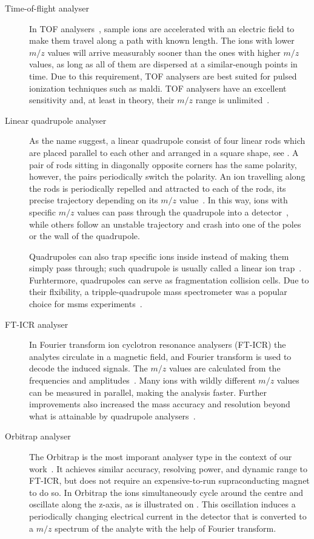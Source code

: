 \begin{description}
  \item[Time-of-flight analyser] In TOF analysers~\cite{stephens1946pulsed}, sample ions are accelerated with an electric field to make them travel along a path with known length. The ions with lower \(m/z\) values will arrive measurably sooner than the ones with higher \(m/z\) values, as long as all of them are dispersed at a similar-enough points in time. Due to this requirement, TOF analysers are best suited for pulsed ionization techniques such as \gls*{maldi}\@. TOF analysers have an excellent sensitivity and, at least in theory, their \(m/z\) range is unlimited~\cite{fuerstenau1995molecular}.
  \item[Linear quadrupole analyser] As the name suggest, a linear quadrupole consist of four linear rods which are placed parallel to each other and arranged in a square shape, see . A pair of rods sitting in diagonally opposite corners has the same polarity, however, the pairs periodically switch the polarity. An ion travelling along the rods is periodically repelled and attracted to each of the rods, its precise trajectory depending on its \(m/z\) value~\cite{paul1990electromagnetic}. In this way, ions with specific \(m/z\) values can pass through the quadrupole into a detector~\cite{paul1953neues}, while others follow an unstable trajectory and crash into one of the poles or the wall of the quadrupole.

    Quadrupoles can also trap specific ions inside instead of making them simply pass through; such quadrupole is usually called a linear ion trap~\cite{mao2003h}. Furhtermore, quadrupoles can serve as fragmentation collision cells. Due to their flxibility, a tripple-quadrupole mass spectrometer was a popular choice for \gls*{msms} experiments~\cite{yost1978selected}.
  \item[FT-ICR analyser] In Fourier transform ion cyclotron resonance analysers (FT-ICR) the analytes circulate in a magnetic field, and Fourier transform is used to decode the induced signals. The \(m/z\) values are calculated from the frequencies and amplitudes~\cite{comisarow1974fourier}. Many ions with wildly different \(m/z\) values can be measured in parallel, making the analysis faster. Further improvements also increased the mass accuracy and resolution beyond what is attainable by quadrupole analysers~\cite{amster1996fourier, easterling1999routine}.
  \item[Orbitrap analyser] The Orbitrap is the most imporant analyser type in the context of our work~\cite{hu2005orbitrap}. It achieves similar accuracy, resolving power, and dynamic range to FT-ICR, but does not require an expensive-to-run supraconducting magnet to do so. In Orbitrap the ions simultaneously cycle around the centre and oscillate along the z-axis, as is illustrated on . This oscillation induces a periodically changing electrical current in the detector that is converted to a \(m/z\) spectrum of the analyte with the help of Fourier transform.


\end{description}
